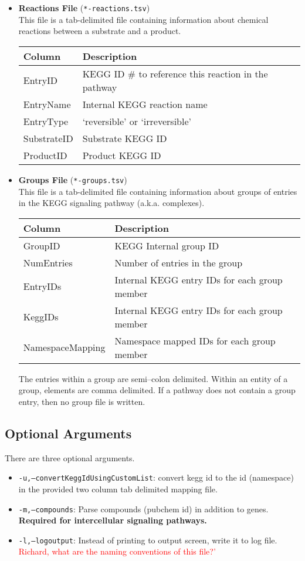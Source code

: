 \documentclass[10pt]{article}
\begin{document}
\begin{itemize}
\item \textbf{Reactions File}  (\texttt{*-reactions.tsv})\\
  This file is a tab-delimited file containing information about chemical
reactions between a substrate and a product.
\begin{center}
\begin{tabular}{l|l}
\textbf{Column} & \textbf{Description} \\ \hline
EntryID        &  KEGG ID \# to reference this reaction in the pathway\\
EntryName      &  Internal KEGG reaction name\\
EntryType      &  `reversible' or `irreversible'\\
SubstrateID    &  Substrate KEGG ID\\
ProductID      &  Product KEGG ID
\end{tabular}
\end{center}

\item \textbf{Groups File}  (\texttt{*-groups.tsv})\\
  This file is a tab-delimited file containing information about groups
of entries in the KEGG signaling pathway (a.k.a. complexes).
\begin{center}
\begin{tabular}{l|l}
\textbf{Column} & \textbf{Description} \\ \hline
GroupID            &  KEGG Internal group ID\\
NumEntries         &  Number of entries in the group\\
EntryIDs           &  Internal KEGG entry IDs for each group member\\
KeggIDs            &  Internal KEGG entry IDs for each group member\\
NamespaceMapping   &  Namespace mapped IDs for each group member\\
\end{tabular}
\end{center}
The entries within a group are semi--colon delimited. Within an entity
of a group, elements are comma delimited. If a pathway does not contain
a group entry, then no group file is written.
\end{itemize}

\subsection{Optional Arguments}
There are three optional arguments.
\begin{itemize}
\item \texttt{-u,--convertKeggIdUsingCustomList}: convert kegg id to the id (namespace) in the provided two column tab delimited mapping file.
\item \texttt{-m,--compounds}: Parse compounds (pubchem id) in addition to genes. \textbf{Required for intercellular signaling pathways.}
\item \texttt{-l,--logoutput}: Instead of printing to output screen, write it to log file. \textcolor{red}{Richard, what are the naming conventions of this file?'}
\end{itemize}
\end{document}

